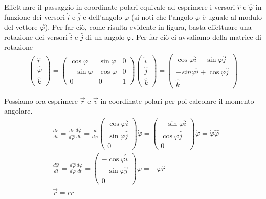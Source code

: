 \documentclass[10pt,a4paper]{article}
\begin{document}
Effettuare il passaggio in coordinate polari equivale ad esprimere i versori $\hat{r}$ e $\hat{\varphi}$ in funzione dei versori $\hat{i}$ e $\hat{j}$ e dell'angolo $\varphi$ (si noti che l'angolo $\varphi$ è uguale al modulo del vettore $\vec{\varphi}$). Per far ciò, come risulta evidente in figura, basta effettuare una rotazione dei versori $\hat{i}$ e $\hat{j}$ di un angolo $\varphi$. Per far ciò ci avvaliamo della matrice di rotazione
\begin{align*}
		\begin{pmatrix}
		\hat{r}\\
		\hat{\varphi}\\
		\hat{k}
	\end{pmatrix}=
	\begin{pmatrix}
		\cos\varphi&\sin\varphi&0\\
		-\sin\varphi&\cos\varphi&0\\
		0&0&1
	\end{pmatrix}
	\begin{pmatrix}
		\hat{i}\\
		\hat{j}\\
		\hat{k}
	\end{pmatrix}=
	\begin{pmatrix}
	\cos\varphi \hat{i} + \sin\varphi\hat{j}\\
	-sin\varphi \hat{i}+\cos\varphi\hat{j}\\
	\hat{k}
\end{pmatrix}\\\\
\end{align*}
Possiamo ora esprimere $\vec{r}$ e $\vec{v}$ in coordinate polari per poi calcolare il momento angolare.
\begin{align*}
&\frac{d\hat{r}}{dt} = \frac{d\hat{r}}{d\hat{\varphi}}\frac{d\hat{\varphi}}{dt} = \frac{d}{d\varphi}
\begin{pmatrix}
	\cos\varphi\hat{i}\\
	\sin\varphi	\hat{j}\\
	0
\end{pmatrix}
\dot{\varphi} = 
\begin{pmatrix}
	-\sin\varphi\hat{i}\\
	\cos\varphi	\hat{j}\\
	0
\end{pmatrix}
\dot{\varphi} = \dot{\varphi}\hat{\varphi}\\ \nonumber
&\frac{d\hat{\varphi}}{dt} = \frac{d\hat{\varphi}}{d\varphi}\frac{d\varphi}{dt} = \begin{pmatrix}
	-\cos\varphi\hat{i}\\
	-\sin\varphi	\hat{j}\\
	0
\end{pmatrix} \dot{\varphi} = -\dot{\varphi}\hat{r}\\ \nonumber
&\vec{r}= r\hat{r} 
\end{align*}
\end{document}
